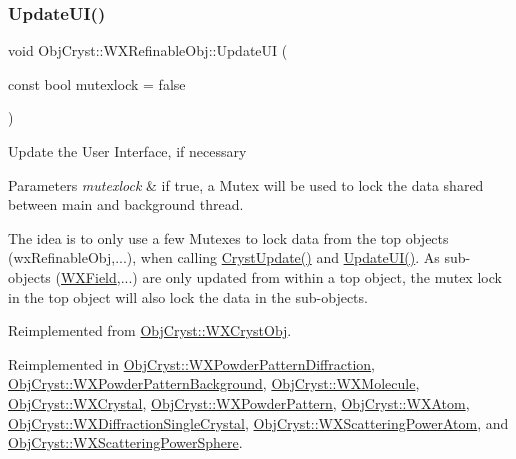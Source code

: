 \subsubsection{\texorpdfstring{UpdateUI()}{UpdateUI()}}
{\footnotesize\ttfamily void Obj\+Cryst\+::\+W\+X\+Refinable\+Obj\+::\+Update\+UI (\begin{DoxyParamCaption}\item[{const bool}]{mutexlock = {\ttfamily false} }\end{DoxyParamCaption})\hspace{0.3cm}{\ttfamily [virtual]}}

Update the User Interface, if necessary


\begin{DoxyParams}{Parameters}
{\em mutexlock} & if true, a Mutex will be used to lock the data shared between main and background thread.\\
\hline
\end{DoxyParams}
The idea is to only use a few Mutexes to lock data from the top objects (wx\+Refinable\+Obj,...), when calling \mbox{\hyperlink{class_obj_cryst_1_1_w_x_refinable_obj_a8249d288e62ad1ebffeea91f77ae37a3}{Cryst\+Update()}} and \mbox{\hyperlink{class_obj_cryst_1_1_w_x_refinable_obj_acbf70975a79661a73a1ae3c39c9c3045}{Update\+U\+I()}}. As sub-\/objects (\mbox{\hyperlink{class_obj_cryst_1_1_w_x_field}{W\+X\+Field}},...) are only updated from within a top object, the mutex lock in the top object will also lock the data in the sub-\/objects. 

Reimplemented from \mbox{\hyperlink{class_obj_cryst_1_1_w_x_cryst_obj_a6578681b14426e8a844ac6e4ca7fafea}{Obj\+Cryst\+::\+W\+X\+Cryst\+Obj}}.



Reimplemented in \mbox{\hyperlink{class_obj_cryst_1_1_w_x_powder_pattern_diffraction_acc1ee5836a4db2466007fe9ebb540e01}{Obj\+Cryst\+::\+W\+X\+Powder\+Pattern\+Diffraction}}, \mbox{\hyperlink{class_obj_cryst_1_1_w_x_powder_pattern_background_a7e54d0ef518f44f897d7363e7f96e4ae}{Obj\+Cryst\+::\+W\+X\+Powder\+Pattern\+Background}}, \mbox{\hyperlink{class_obj_cryst_1_1_w_x_molecule_ac234eca0ea8eb99e4d94387c506f1643}{Obj\+Cryst\+::\+W\+X\+Molecule}}, \mbox{\hyperlink{class_obj_cryst_1_1_w_x_crystal_a62946717943682dc2ac07ea4584030f4}{Obj\+Cryst\+::\+W\+X\+Crystal}}, \mbox{\hyperlink{class_obj_cryst_1_1_w_x_powder_pattern_aaeace05033eaea9499398825fc8244da}{Obj\+Cryst\+::\+W\+X\+Powder\+Pattern}}, \mbox{\hyperlink{class_obj_cryst_1_1_w_x_atom_a09c1212622fe6bb17ca8443455370551}{Obj\+Cryst\+::\+W\+X\+Atom}}, \mbox{\hyperlink{class_obj_cryst_1_1_w_x_diffraction_single_crystal_a2b8ef5fa0663d1526258a17498e9b0fc}{Obj\+Cryst\+::\+W\+X\+Diffraction\+Single\+Crystal}}, \mbox{\hyperlink{class_obj_cryst_1_1_w_x_scattering_power_atom_abd8a32f23a0b29e45ae32e40f0fec212}{Obj\+Cryst\+::\+W\+X\+Scattering\+Power\+Atom}}, and \mbox{\hyperlink{class_obj_cryst_1_1_w_x_scattering_power_sphere_a2e1eed3ea3e179e57621251cc844be3e}{Obj\+Cryst\+::\+W\+X\+Scattering\+Power\+Sphere}}.

